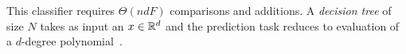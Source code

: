 This classifier requires $\Theta(ndF)$ comparisons and additions. %
%
A {\em decision tree} of size $N$ takes as input an $x\in{\mathbb{R}}^d$
 and 
 the prediction task
reduces to evaluation of a $d$-degree polynomial~\cite{shafindss}.

